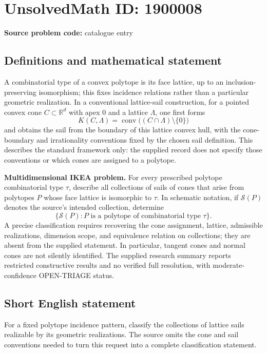 \documentclass[11pt]{article}
\begin{document}
\section*{UnsolvedMath ID: 1900008}
\textbf{Source problem code:} catalogue entry
\subsection{Definitions and mathematical statement}
A combinatorial type of a convex polytope is its face lattice, up to an inclusion-preserving isomorphism; this fixes incidence relations rather than a particular geometric realization. In a conventional lattice-sail construction, for a pointed convex cone $C\subset\mathbb R^d$ with apex $0$ and a lattice $\Lambda$, one first forms
\[
K(C,\Lambda)=\operatorname{conv}\big((C\cap\Lambda)\setminus\{0\}\big)
\]
and obtains the sail from the boundary of this lattice convex hull, with the cone-boundary and irrationality conventions fixed by the chosen sail definition. This describes the standard framework only: the supplied record does not specify those conventions or which cones are assigned to a polytope.

\textbf{Multidimensional IKEA problem.} For every prescribed polytope combinatorial type $\tau$, describe all collections of sails of cones that arise from polytopes $P$ whose face lattice is isomorphic to $\tau$. In schematic notation, if $\mathcal S(P)$ denotes the source's intended collection, determine
\[
\{\mathcal S(P):P\text{ is a polytope of combinatorial type }\tau\}.
\]
A precise classification requires recovering the cone assignment, lattice, admissible realizations, dimension scope, and equivalence relation on collections; they are absent from the supplied statement. In particular, tangent cones and normal cones are not silently identified. The supplied research summary reports restricted constructive results and no verified full resolution, with moderate-confidence OPEN-TRIAGE status.
\subsection{Short English statement}
For a fixed polytope incidence pattern, classify the collections of lattice sails realizable by its geometric realizations. The source omits the cone and sail conventions needed to turn this request into a complete classification statement.
\end{document}
